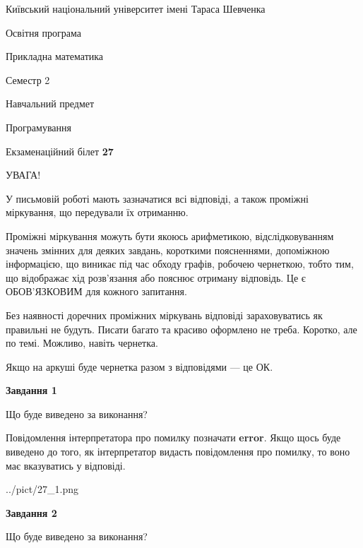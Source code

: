 \documentclass[12pt, ukrainian]{article}
\begin{document}
{{\begin {small}\par
{ \center  Київський національний університет імені Тараса Шевченка \par}
{\parbox {5 cm}{Освітня програма \hfill}{\parbox {7 cm}{Прикладна математика \hfill}}\parbox {6 cm}{\hfill Семестр 2}}\par
{\parbox {5 cm} {Навчальний предмет \hfill}\parbox {7 cm}{Програмування \hfill}\parbox {6cm}{\hfill}\par}\vspace{-7pt} \end{small}}{\center Екзаменаційний білет \No \textbf
{ 27 }\par}}
{
\begin {large}
УВАГА!

У письмовій роботі мають зазначатися всі відповіді, а також проміжні міркування, що передували їх отриманню.

Проміжні міркування можуть бути якоюсь арифметикою, відслідковуванням зна\-чень змінних для деяких завдань,
короткими поясненнями, допоміжною інформацією, що виникає під час обходу графів, робочею чернеткою,
тобто тим, що відображає хід розв’язання або пояснює отриману відповідь.
Це є ОБОВ’ЯЗКОВИМ для кожного запитання.

Без наявності доречних проміжних міркувань відповіді зараховуватись як правиль\-ні не будуть.
Писати багато та красиво оформлено не треба. Коротко, але по темі. Можли\-во, навіть чернетка.

Якщо на аркуші буде чернетка разом з відповідями --- це ОК.

\newpage

{\begin {center}\textbf{Завдання 1}\end {center}}\par
Що буде виведено за виконання?

Повідомлення інтерпретатора про помилку позначати \textbf{error}.
Якщо щось буде виведено до того, як інтерпретатор видасть повідомлення про помилку, 
то воно має вказуватись у відповіді. \par


\begin{center}
	{../pict/27_1.png}
\end{center}
\newpage

{\begin {center}\textbf{Завдання 2}\end {center}}\par
Що буде виведено за виконання?


\end{large}}
\end{document}
